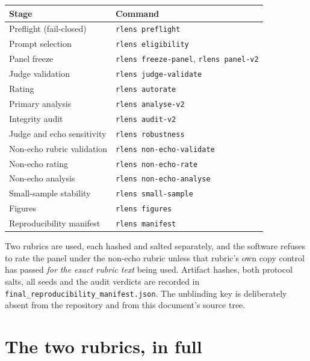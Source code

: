 \documentclass[11pt]{article}
\begin{document}
\begin{center}
\small
\begin{tabular}{ll}
\toprule
Stage & Command \\
\midrule
Preflight (fail-closed)      & \texttt{rlens preflight} \\
Prompt selection             & \texttt{rlens eligibility} \\
Panel freeze                 & \texttt{rlens freeze-panel}, \texttt{rlens panel-v2} \\
Judge validation             & \texttt{rlens judge-validate} \\
Rating                       & \texttt{rlens autorate} \\
Primary analysis             & \texttt{rlens analyse-v2} \\
Integrity audit              & \texttt{rlens audit-v2} \\
Judge and echo sensitivity   & \texttt{rlens robustness} \\
Non-echo rubric validation   & \texttt{rlens non-echo-validate} \\
Non-echo rating              & \texttt{rlens non-echo-rate} \\
Non-echo analysis            & \texttt{rlens non-echo-analyse} \\
Small-sample stability       & \texttt{rlens small-sample} \\
Figures                      & \texttt{rlens figures} \\
Reproducibility manifest     & \texttt{rlens manifest} \\
\bottomrule
\end{tabular}
\end{center}

\begin{sloppypar}
\noindent
Two rubrics are used, each hashed and salted separately, and the software refuses
to rate the panel under the non-echo rubric unless that rubric's own copy control
has passed \emph{for the exact rubric text} being used. Artifact hashes, both
protocol salts, all seeds and the audit verdicts are recorded in
\texttt{final\_reproducibility\_\allowbreak manifest.json}. The unblinding key is
deliberately absent from the repository and from this document's source tree.
\end{sloppypar}


\appendix
\section{The two rubrics, in full}
\label{sec:rubrics}
\end{document}
